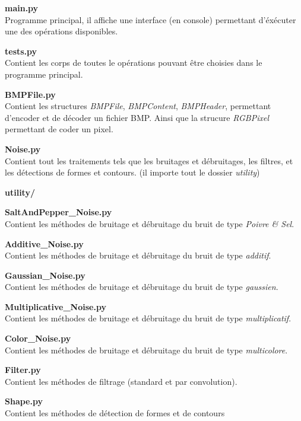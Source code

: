 \documentclass{article}
\begin{document}
			\begin{description}
				\item \textbf{main.py} \hfill \\
					Programme principal, il affiche une interface (en console) permettant d'éxécuter une des opérations disponibles.
				\item \textbf{tests.py} \hfill \\
					Contient les corps de toutes le opérations pouvant être choisies dans le programme principal.
				\item \textbf{BMPFile.py} \hfill \\
					Contient les structures \emph{BMPFile}, \emph{BMPContent}, \emph{BMPHeader}, permettant d'encoder et de décoder un fichier BMP. Ainsi que la strucure \emph{RGBPixel} permettant de coder un pixel.
				\item \textbf{Noise.py} \hfill \\
					Contient tout les traitements tels que les bruitages et débruitages, les filtres, et les détections de formes et contours. (il importe tout le dossier \emph{utility})
				\item \textbf{utility/}
				\begin{description}
					\item \textbf{SaltAndPepper\_Noise.py} \hfill \\
						Contient les méthodes de bruitage et débruitage du bruit de type \emph{Poivre \& Sel}.
					\item \textbf{Additive\_Noise.py} \hfill \\
						Contient les méthodes de bruitage et débruitage du bruit de type \emph{additif}.
					\item \textbf{Gaussian\_Noise.py} \hfill \\
						Contient les méthodes de bruitage et débruitage du bruit de type \emph{gaussien}.
					\item \textbf{Multiplicative\_Noise.py} \hfill \\
						Contient les méthodes de bruitage et débruitage du bruit de type \emph{multiplicatif}.
					\item \textbf{Color\_Noise.py} \hfill \\
						Contient les méthodes de bruitage et débruitage du bruit de type \emph{multicolore}.
					\item \textbf{Filter.py} \hfill \\
						Contient les méthodes de filtrage (standard et par convolution).
					\item \textbf{Shape.py} \hfill \\
						Contient les méthodes de détection de formes et de contours

				\end{description}
			\end{description}
		
\end{document}
